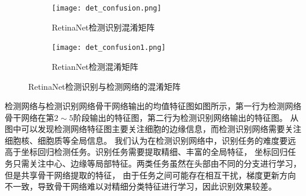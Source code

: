 \begin{table}[htbp]   
  \caption{RetinaNet网络各类别的准确率与召回率}      
  \centering    
  \label{table:cell_cls}
  \centering  
\end{table}

\begin{figure}[htbp]                  
  \centering                   
	\begin{subfigure}{0.48\linewidth}
		\centering
    \texttt{[image: det\_confusion.png]}                   
    \caption{RetinaNet检测识别混淆矩阵}
	\end{subfigure}
	\begin{subfigure}{0.48\linewidth}
		\centering
		\texttt{[image: det\_confusion1.png]}
    \caption{RetianNet检测混淆矩阵}
	\end{subfigure}
  \caption{RetinaNet检测识别与检测网络的混淆矩阵}                   
  \label{fig:det_confusion}      
\end{figure}   

检测网络与检测识别网络骨干网络输出的均值特征图如图所示，第一行为检测网络骨干网络在第$2\sim 5$阶段输出的特征图，第二行为检测识别网络输出的特征图。
从图中可以发现检测网络特征图主要关注细胞的边缘信息，而检测识别网络需要关注细胞核、细胞质等全局信息。
我们认为在检测识别网络中，识别任务的难度要远高于坐标回归检测任务。识别任务需要提取精细、丰富的全局特征，
坐标回归任务只需关注中心、边缘等局部特征。两类任务虽然在头部由不同的分支进行学习，但是共享骨干网络提取的特征，
由于任务之间可能存在相互干扰，梯度更新方向不一致，导致骨干网络难以对精细分类特征进行学习，因此识别效果较差。

